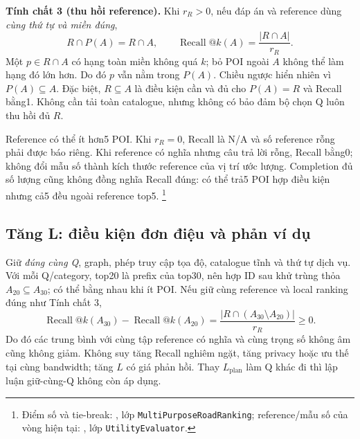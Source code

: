 \noindent\textbf{Tính chất 3 (thu hồi reference).}
Khi $r_R>0$, nếu đáp án và reference dùng \emph{cùng thứ tự và miền đúng},
\begin{equation}
 R\cap P(A)=R\cap A,\qquad
 \operatorname{Recall}@k(A)=\frac{|R\cap A|}{r_R}.
 \label{eq:formal-service-recall-identity}
\end{equation}
Một $p\in R\cap A$ có hạng toàn miền không quá $k$; bỏ POI ngoài $A$
không thể làm hạng đó lớn hơn. Do đó $p$ vẫn nằm trong $P(A)$. Chiều
ngược hiển nhiên vì $P(A)\subseteq A$. Đặc biệt, $R\subseteq A$ là điều
kiện cần và đủ cho $P(A)=R$ và Recall bằng1. Không cần tải toàn catalogue,
nhưng không có bảo đảm bộ chọn Q luôn thu hồi đủ $R$.

Reference có thể ít hơn5 POI. Khi $r_R=0$, Recall là N/A và số reference
rỗng phải được báo riêng. Khi reference có nghĩa nhưng câu trả lời rỗng,
Recall bằng0; không đổi mẫu số thành kích thước reference của vị trí
ước lượng. Completion đủ số lượng cũng không đồng nghĩa Recall đúng:
có thể trả5 POI hợp điều kiện nhưng cả5 đều ngoài reference top5.
\footnote{Điểm số và tie-break:
, lớp \texttt{MultiPurposeRoadRanking};
reference/mẫu số của vòng hiện tại:
,
lớp \texttt{UtilityEvaluator}.}

\subsection{Tăng L: điều kiện đơn điệu và phản ví dụ}
\label{sec:formal-service-depth-monotonicity}

Giữ \emph{đúng cùng Q}, graph, phép truy cập tọa độ, catalogue tĩnh và
thứ tự dịch vụ. Với mỗi Q/category, top20 là prefix của top30, nên hợp
ID sau khử trùng thỏa $A_{20}\subseteq A_{30}$; có thể bằng nhau khi ít
POI. Nếu giữ cùng reference và local ranking đúng như Tính chất 3,
\begin{equation}
 \operatorname{Recall}@k(A_{30})-
 \operatorname{Recall}@k(A_{20})
 =\frac{|R\cap(A_{30}\setminus A_{20})|}{r_R}\geq0.
 \label{eq:formal-service-depth-monotonicity}
\end{equation}
Do đó các trung bình với cùng tập reference có nghĩa và cùng trọng số
không âm cũng không giảm. Không suy tăng Recall nghiêm ngặt, tăng
privacy hoặc ưu thế tại cùng bandwidth; tăng $L$ có giá phản hồi. Thay
$L_{\mathrm{plan}}$ làm Q khác đi thì lập luận giữ-cùng-Q không còn áp dụng.

